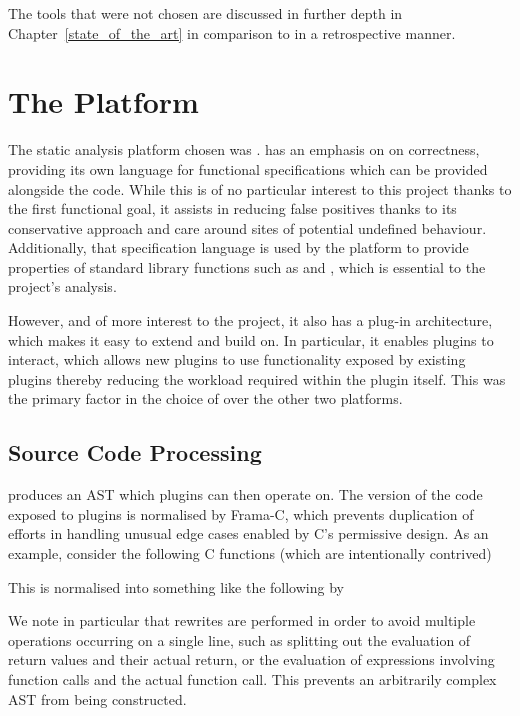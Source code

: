 The tools that were not chosen are discussed in further depth in Chapter~\ref{state_of_the_art} in comparison to  in a retrospective manner.

\section{The  Platform}

The static analysis platform chosen was .  has an emphasis on on correctness, providing its own language for functional specifications which can be provided alongside the code. While this is of no particular interest to this project thanks to the first functional goal, it assists in reducing false positives thanks to its conservative approach and care around sites of potential undefined behaviour. Additionally, that specification language is used by the platform to provide properties of standard library functions such as \malloc{} and \free{}, which is essential to the project's analysis.

However, and of more interest to the project, it also has a plug-in architecture, which makes it easy to extend and build on. In particular, it enables plugins to interact, which allows new plugins to use functionality exposed by existing plugins thereby reducing the workload required within the plugin itself. This was the primary factor in the choice of  over the other two platforms.

\subsection{Source Code Processing}

 produces an AST which plugins can then operate on. The version of the code exposed to plugins is normalised by Frama-C, which prevents duplication of efforts in handling unusual edge cases enabled by C's permissive design. As an example, consider the following C functions (which are intentionally contrived)



This is normalised into something like the following by 



We note in particular that rewrites are performed in order to avoid multiple operations occurring on a single line, such as splitting out the evaluation of return values and their actual return, or the evaluation of expressions involving function calls and the actual function call. This prevents an arbitrarily complex AST from being constructed.


